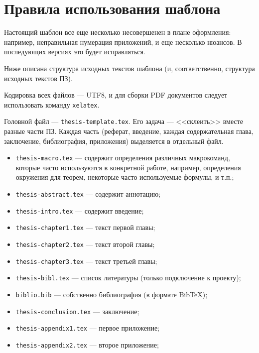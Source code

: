 ﻿\chapter{Правила использования шаблона}\label{app-manual}

Настоящий шаблон все еще несколько несовершенен в плане оформления: например, неправильная нумерация приложений, и еще несколько нюансов. В последующих версиях это будет исправляться.

Ниже описана структура исходных текстов шаблона (и, соответственно, структура исходных текстов ПЗ).

Кодировка всех файлов — UTF8, и для сборки PDF документов следует использовать команду \texttt{xelatex}.

Головной файл --- \texttt{thesis-template.tex}. Его задача --- <<склеить>> вместе разные части ПЗ. Каждая часть (реферат, введение, каждая содержательная глава, заключение, библиография, приложения) выделяется в отдельный файл. 

\begin{itemize}
	\item[] \texttt{thesis-macro.tex} --- содержит определения различных макрокоманд, которые часто используются в конкретной работе, например, определения окружения для теорем, некоторые часто используемые формулы, и т.п.;
	\item[] \texttt{thesis-abstract.tex} --- содержит аннотацию;
	\item[] \texttt{thesis-intro.tex} --- содержит введение;
	\item[] \texttt{thesis-chapter1.tex} --- текст первой главы;
	\item[] \texttt{thesis-chapter2.tex} --- текст второй главы;
	\item[] \texttt{thesis-chapter3.tex} --- текст третьей главы;
	\item[] \texttt{thesis-bibl.tex} --- список литературы (только подключение к
	проекту);
	\item[] \texttt{biblio.bib} --- собственно библиография (в формате BibTeX);
	\item[] \texttt{thesis-conclusion.tex} --- заключение;
	\item[] \texttt{thesis-appendix1.tex} --- первое приложение;
	\item[] \texttt{thesis-appendix2.tex} --- второе приложение;
\end{itemize}



